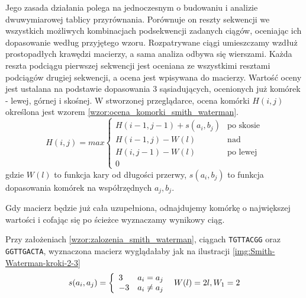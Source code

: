 Jego zasada działania polega na jednoczesnym o budowaniu i analizie dwuwymiarowej tablicy przyrównania. Porównuje on reszty sekwencji we wszystkich możliwych kombinacjach podsekwencji zadanych ciągów, oceniając ich dopasowanie według przyjętego wzoru.
Rozpatrywane ciągi umieszczamy wzdłuż prostopadłych krawędzi macierzy, a sama analiza odbywa się wierszami.
Każda reszta podciągu pierwszej sekwencji jest oceniana ze wszystkimi resztami podciągów drugiej sekwencji, a ocena jest wpisywana do macierzy.
Wartość oceny jest ustalana na podstawie dopasowania 3 sąsiadujących, ocenionych już komórek - lewej, górnej i skośnej.
W stworzonej przeglądarce, ocena komórki $H(i,j)$ określona jest wzorem \ref{wzor:ocena_komorki_smith_waterman}.
\begin{equation}
\label{wzor:ocena_komorki_smith_waterman}
H(i,j) = max \left\{ 
	\begin{array}{ll}
		H(i-1,j-1) + s(a_i, b_j) & \textrm{po skosie}\\
		H(i-1,j) - W(l) & \textrm{nad}\\
		H(i, j-1) -W(l)& \textrm{po lewej}\\
		0 &
	\end{array}
	\right.
\end{equation}
gdzie $W(l)$ to funkcja kary od długości przerwy, $s(a_i, b_j)$ to funkcja dopasowania komórek na współrzędnych $a_j, b_j$.

Gdy macierz będzie już cała uzupełniona, odnajdujemy komórkę o największej wartości i cofając się po ścieżce wyznaczamy wynikowy ciąg.

Przy założeniach \ref{wzor:zalozenia_smith_waterman}, ciągach \verb|TGTTACGG| oraz \verb|GGTTGACTA|, wyznaczona macierz wyglądałaby jak na ilustracji \ref{img:Smith-Waterman-kroki-2-3}
\begin{equation}
\label{wzor:zalozenia_smith_waterman}
s(a_i,a_j) =\left\{ 
	\begin{array}{ll}
	3 & \textrm{$a_i = a_j$}\\
	-3 & \textrm{$a_i \ne a_j$}\\
\end{array}\\
\right.\\
{\phantom{1}}
W(l) = 2l, W_1 = 2
\end{equation}

